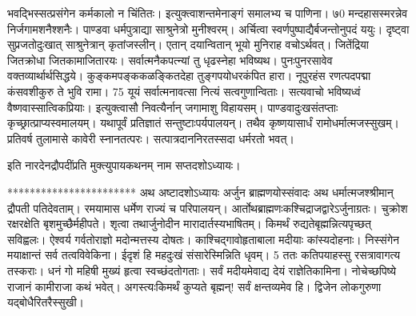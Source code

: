 भवद्भिस्सत्प्रसंगेन कर्मकालो न चिंतितः।
 इत्युक्त्वाशन्तमेनाङ्गं समालभ्य च पाणिना।
 ७0 मन्दहासस्मरन्नेव निर्जगामशनैश्शनैः।
 पाण्डवा धर्मपुत्राद्या साश्रुनेत्रो मुनीश्वरम्।
 अर्चित्वा स्वर्णपुष्पाद्यैर्बजन्तोनुपदं ययुः।
 दृष्ट्वा सुप्रजतोदुःखात् साश्रुनेत्रान् कृतांजस्लीन्।
 एतान् दयान्वितान् भूयो मुनिराह वचोऽर्थवत्।
 जितेंद्रिया जितक्रोधा जितकामाजितारयः।
 सर्वात्मनैकपत्न्यां तु धृढस्नेहा भविष्यथ।
 पुनःपुनरसावेव वक्तव्यार्थार्थसिद्धये।
 कुङ्कमपङ्ककळङ्कितदेहा तुङ्गपयोधरकंपित हारा।
 नूपुरहंस रणत्पदपद्मा कंसवशीकुरु
ते भुवि रामा।
75 यूयं सर्वात्मनावत्सा नित्यं सत्वगुणान्विताः।
 सत्यवाचो भविष्यध्वं वैष्णवास्सात्विकप्रियाः।
 इत्युक्त्वासौ निवत्यैर्नान् जगामाशु विहायसम्।
 पाण्डवादुःखसंतप्ताः कृच्छ्रात्प्राप्यस्वमालयम्।
 यथापूर्वं प्रतिज्ञातं सन्तुष्टाःपर्यपालयन्।
 तथैव कृष्णयासार्धं रामोधर्मात्मजस्सुखम्।
 प्रतिवर्ष तुलामासे कावेरी स्नानतत्परः।
 सत्पात्रदाननिरतस्सदा धर्मरतो भवत्।
 
इति नारदेनद्रौपदींप्रति मुक्त्युपायकथनम् नाम
सप्तदशोऽध्यायः।

***********************
अथ अष्टादशोऽध्यायः
अर्जुन ब्राह्मणयोस्संवादः अथ धर्मात्मजश्श्रीमान् द्रौपती पतिदेवताम्।
 रमयामास धर्मेण राज्यं च परिपालयन्।
 आर्तोथब्राह्मणःकश्चिद्राजद्वारेऽर्जुनाग्रतः।
 चुक्रोश रक्षरक्षेति बृशमुच्छैर्महीपते।
 शृत्वा तथार्जुनोदीन मारादार्तस्यभाषितम्।
 किमर्थं रुद्यतेबृह्मन्नित्यपृच्छत् सविह्वलः।
 ऐश्वर्य गर्वतोराज्ञो मदोन्मत्तस्य दोषतः।
 काश्चिद्गावोहृताबाला मदीयाः कांस्यदोहनाः।
 निस्संगेन मयाक्षान्तं सर्व तत्वविवेकिना।
 ईदृशं हि महदुःखं संसारेस्मिन्निति धृवम्।
 5 ततः कतिपयाहस्सु रसत्रावागत्य तस्कराः।
 धनं गो महिषी मुख्यं हृत्वा स्वच्छंदतोगताः।
 सर्वं मदीयमेवाद्य देयं राज्ञेतिकामिना।
 नोचेच्छपिष्ये राजानं कामीराजा कथं भवेत्।
 अगस्त्यःकिमर्थं कुप्यते बृह्मन्! सर्वं क्षन्तव्यमेव हि।
 द्विजेन लोकगुरुणा यद्बोधैरितरैस्सुखी।
 
